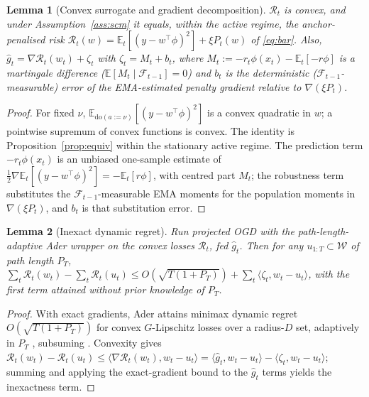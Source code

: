 \documentclass[12pt]{article}
\theoremstyle{plain}
\newtheorem{lemma}{Lemma}
\theoremstyle{remark}
\newcommand{\E}{\mathbb{E}}
\newcommand{\doop}{\mathrm{do}}
\begin{document}
\begin{lemma}[Convex surrogate and gradient decomposition]\label{lem:surrogate}
$\mathcal{R}_t$ is convex, and under Assumption~\ref{ass:scm} it equals, within the active
regime, the anchor-penalised risk $\mathcal{R}_t(w)=\E_t[(y-w^\top\phi)^2]+\xi P_t(w)$ of
\eqref{eq:bar}. Also, $\hat g_t=\nabla\mathcal{R}_t(w_t)+\zeta_t$ with $\zeta_t=M_t+b_t$,
where $M_t:=-r_t\phi(x_t)-\E_t[-r\phi]$ is a martingale difference
($\E[M_t\mid\mathcal F_{t-1}]=0$) and $b_t$ is the deterministic
($\mathcal F_{t-1}$-measurable) error of the EMA-estimated penalty gradient relative to
$\nabla(\xi P_t)$.
\end{lemma}
\begin{proof}
For fixed $\nu$, $\E_{\doop(a:=\nu)}[(y-w^\top\phi)^2]$ is a convex quadratic in $w$; a
pointwise supremum of convex functions is convex. The identity is
Proposition~\ref{prop:equiv} within the stationary active regime. The prediction term
$-r_t\phi(x_t)$ is an unbiased one-sample estimate of
$\tfrac12\nabla\E_t[(y-w^\top\phi)^2]=-\E_t[r\phi]$, with centred part $M_t$; the
robustness term substitutes the $\mathcal F_{t-1}$-measurable EMA moments for the
population moments in $\nabla(\xi P_t)$, and $b_t$ is that substitution error.
\end{proof}

\begin{lemma}[Inexact dynamic regret]\label{lem:ogd}
Run projected OGD with the path-length-adaptive Ader wrapper
\citep{zhang2018adaptive} on the convex losses $\mathcal{R}_t$, fed $\hat g_t$. Then for any
$u_{1:T}\subset\mathcal{W}$ of path length $P_T$,
$\sum_t\mathcal{R}_t(w_t)-\sum_t\mathcal{R}_t(u_t)\le O(\sqrt{T(1+P_T)})+\sum_t\langle\zeta_t,
w_t-u_t\rangle$, with the first term attained without prior knowledge of $P_T$.
\end{lemma}
\begin{proof}
With exact gradients, Ader attains minimax dynamic regret $O(\sqrt{T(1+P_T)})$ for
convex $G$-Lipschitz losses over a radius-$D$ set, adaptively in $P_T$
\citep{zhang2018adaptive}, subsuming \citet{zinkevich2003ogd,hazan2016oco}. Convexity
gives $\mathcal{R}_t(w_t)-\mathcal{R}_t(u_t)\le\langle\nabla\mathcal{R}_t(w_t),w_t-u_t\rangle=
\langle\hat g_t,w_t-u_t\rangle-\langle\zeta_t,w_t-u_t\rangle$; summing and applying the
exact-gradient bound to the $\hat g_t$ terms yields the inexactness term.
\end{proof}
\end{document}
